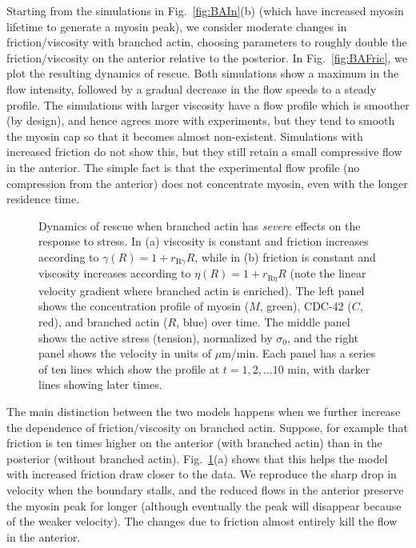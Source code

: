 \documentclass[11pt]{article}
\newcommand{\red}[1]{\color{red}#1\normalcolor}
\newcommand{\6}[1]{#1_{\text{6}}}
\newcommand{\3}[1]{#1_{\text{3}}}
\begin{document}
Starting from the simulations in Fig.\ \ref{fig:BAIn}(b) (which have increased myosin lifetime to generate a myosin peak), we consider moderate changes in friction/viscosity with branched actin, choosing parameters to roughly double the friction/viscosity on the anterior relative to the posterior. In Fig.\ \ref{fig:BAFric}, we plot the resulting dynamics of rescue. Both simulations show a maximum in the flow intensity, followed by a gradual decrease in the flow speeds to a steady profile. The simulations with larger viscosity have a flow profile which is smoother (by design), and hence agrees more with experiments, but they tend to smooth the myosin cap so that it becomes almost non-existent. Simulations with increased friction do not show this, but they still retain a small compressive flow in the anterior. \red{The simple fact is that the experimental flow profile (no compression from the anterior) does not concentrate myosin, even with the longer residence time.}

\begin{figure}
\centering
{}
\caption{\label{fig:BAFricLg} Dynamics of rescue when branched actin has \emph{severe} effects on the response to stress. In (a) viscosity is constant and friction increases according to $\gamma(R)=1+r_\text{R$\gamma$}R$, while in (b) friction is constant and viscosity increases according to $ \eta(R)=1+r_\text{R$\eta$} R$ (note the linear velocity gradient where branched actin is enriched). The left panel shows the concentration profile of myosin ($M$, green), CDC-42 ($C$, red), and branched actin ($R$, blue) over time. The middle panel shows the active stress (tension), normalized by $\sigma_0$, and the right panel shows the velocity in units of $\mu$m/min. Each panel has a series of ten lines which show the profile at $t=1, 2, \dots 10$ min, with darker lines showing later times.}
\end{figure}


The main distinction between the two models happens when we further increase the dependence of friction/viscosity on branched actin. Suppose, for example that friction is ten times higher on the anterior (with branched actin) than in the posterior (without branched actin). Fig.\ \ref{fig:BAFricLg}(a) shows that this helps the model with increased friction draw closer to the data. We reproduce the sharp drop in velocity when the boundary stalls, and the reduced flows in the anterior preserve the myosin peak for longer (although eventually the peak will disappear because of the weaker velocity). The changes due to friction almost entirely kill the flow in the anterior. 
\end{document}
